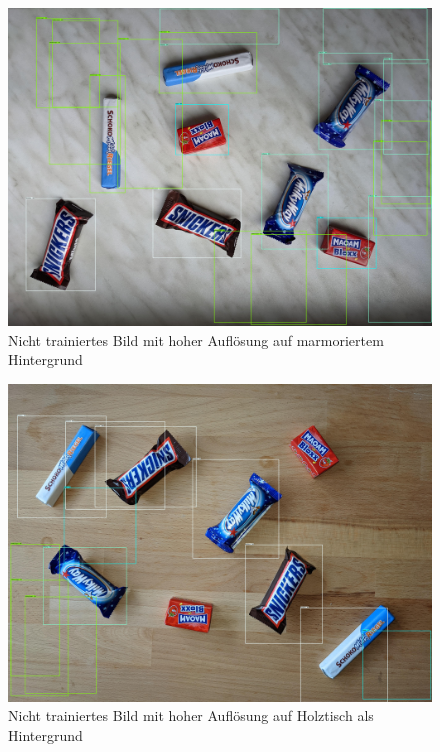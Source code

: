     \begin{figure}[H]
        \centering
        \includegraphics[angle = 90, width = \textwidth]{Bilder/models/model_comparison/ssd_resnet50_v1_fpn_640x640_coco17_tpu-8/HD_on_marble.jpg}
        \caption{Nicht trainiertes Bild mit hoher Auflösung auf marmoriertem Hintergrund}
    \end{figure}
    
    \begin{figure}[H]
        \centering
        \includegraphics[angle = 90, width = \textwidth]{Bilder/models/model_comparison/ssd_resnet50_v1_fpn_640x640_coco17_tpu-8/HD_on_wood.jpg}
        \caption{Nicht trainiertes Bild mit hoher Auflösung auf Holztisch als Hintergrund}
    \end{figure}
    
